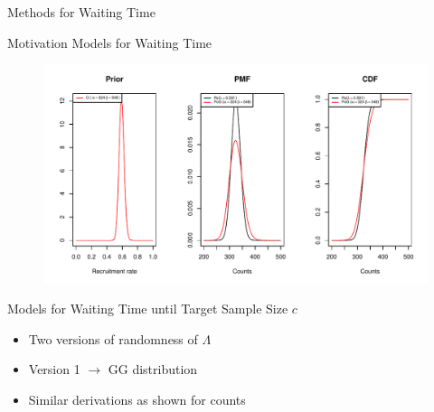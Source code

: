 \documentclass[english]{beamer}\usepackage[]{graphicx}\usepackage[]{xcolor}
\makeatletter
\def\maxwidth{ %
  \ifdim\Gin@nat@width>\linewidth
    \linewidth
  \else
    \Gin@nat@width
  \fi
}
\newenvironment{knitrout}{}{} %
\makeatother
\begin{document}
\begin{frame}{Methods for Waiting Time}

\end{frame}

\begin{frame}{Motivation Models for Waiting Time}
\begin{figure}
\centering
\begin{knitrout}
\color{fgcolor}
\includegraphics[width=\maxwidth]{figures/figunnamed-chunk-11-1} 
\end{knitrout}

\end{figure}
\end{frame}

\begin{frame}{Models for Waiting Time until Target Sample Size $c$}
\begin{table}[h!]
\centering
{}
\end{table}

\begin{itemize}
\item Two versions of randomness of $\Lambda$
\item Version 1 $\rightarrow$ GG distribution 
\item Similar derivations as shown for counts
\end{itemize}
\end{frame}
\end{document}
